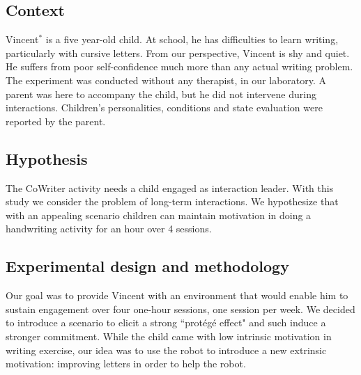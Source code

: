 \documentclass{sig-alternate}
\begin{document}
\subsection{Context}
Vincent$^*$ is a five year-old child. At school, he has difficulties to learn writing, particularly with cursive letters. From our perspective, Vincent is shy and quiet. He suffers from poor self-confidence much more than any actual writing problem. The experiment was conducted without any therapist, in our laboratory. A parent was here to accompany the child, but he did not intervene during interactions. Children's personalities, conditions and state evaluation were reported by the parent.

\subsection{Hypothesis}

The CoWriter activity needs a child engaged as interaction leader. 
With this study we consider the problem of long-term interactions. We hypothesize that with an appealing scenario children can maintain motivation in doing a handwriting activity for an hour over 4 sessions.

%

\subsection{Experimental design and methodology}

Our goal was to provide Vincent with
an environment that would enable him to sustain engagement over four one-hour sessions, 
one session per week. We decided to introduce a scenario to elicit a strong ``prot\'eg\'e effect" and such induce a stronger commitment. While the child came with low intrinsic motivation in writing exercise, our idea was to use the robot to introduce a new extrinsic motivation: improving letters in order to help the robot. 
\end{document}
